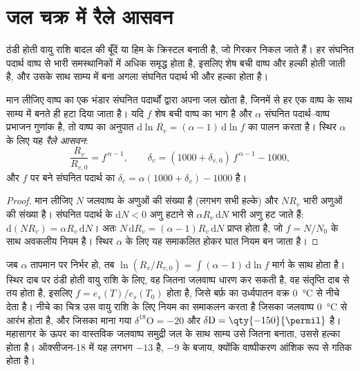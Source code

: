 \section{जल चक्र में रैले आसवन}\label{sec:b3:stable-isotopes:rayleigh}

ठंडी होती वायु राशि बादल की बूँदें या हिम के क्रिस्टल बनाती है, जो गिरकर
निकल जाते हैं। हर संघनित पदार्थ वाष्प से भारी समस्थानिकों में अधिक समृद्ध होता है,
इसलिए शेष बची वाष्प और हल्की होती जाती है, और उसके साथ साम्य में बना अगला संघनित पदार्थ
भी और हल्का होता है।

\begin{proposition}[रैले आसवन]\label{prop:b3:stable-isotopes:rayleigh-distillation}
मान लीजिए वाष्प का एक भंडार संघनित पदार्थों द्वारा अपना जल खोता है, जिनमें से
हर एक वाष्प के साथ साम्य में बनते ही हटा दिया जाता है। यदि $f$ शेष बची
वाष्प का भाग है और $\alpha$ संघनित पदार्थ--वाष्प प्रभाजन गुणांक है, तो
वाष्प का अनुपात $\mathrm d\ln R_v = (\alpha - 1)\,\mathrm d\ln f$ का पालन करता है। स्थिर
$\alpha$ के लिए यह \emph{रैले
आसवन}:
\[
\frac{R_v}{R_{v,0}} = f^{\,\alpha - 1}, \qquad
\delta_v = (1000 + \delta_{v,0})\,f^{\,\alpha - 1} - 1000,
\]
और $f$ पर बने संघनित पदार्थ का $\delta_c = \alpha(1000 + \delta_v) - 1000$ है।
\end{proposition}

\begin{proof}
मान लीजिए $N$ जलवाष्प के अणुओं की संख्या है (लगभग सभी हल्के) और $N R_v$
भारी अणुओं की संख्या है। संघनित पदार्थ के $\mathrm dN < 0$ अणु हटाने से
$\alpha R_v\,\mathrm dN$ भारी अणु हट जाते हैं: $\mathrm d(NR_v) = \alpha
R_v\,\mathrm dN$। अतः $N\,\mathrm dR_v = (\alpha - 1)R_v\,\mathrm dN$ प्राप्त होता है, जो
$f = N/N_0$ के साथ अवकलीय नियम है। स्थिर $\alpha$ के लिए यह समाकलित होकर
घात नियम बन जाता है।
\end{proof}

जब $\alpha$ तापमान पर निर्भर हो, तब $\ln(R_v/R_{v,0}) = \int(\alpha - 1)\,
\mathrm d\ln f$ मार्ग के साथ होता है। स्थिर दाब पर ठंडी होती वायु राशि के लिए,
वह जितना जलवाष्प धारण कर सकती है, वह संतृप्ति दाब से तय होता है, इसलिए $f =
e_s(T)/e_s(T_0)$ होता है, जिसे बर्फ़ का उर्ध्वपातन वक्र
\qty{0}{\celsius} से नीचे देता है। नीचे का चित्र उस वायु राशि के लिए नियम का समाकलन करता है
जिसका जलवाष्प \qty{0}{\celsius} से आरंभ होता है, और जिसका माना गया $\delta^{18}\mathrm O = -20$
और $\delta\mathrm D = \qty{-150}{\permil}$ है। महासागर के ऊपर का वास्तविक जलवाष्प
समुद्री जल के साथ साम्य उसे जितना बनाता, उससे हल्का होता है। ऑक्सीजन-18 में यह लगभग $-13$ है,
\qty{-9}{\permil} के बजाय, क्योंकि वाष्पीकरण आंशिक रूप से गतिक होता है।

